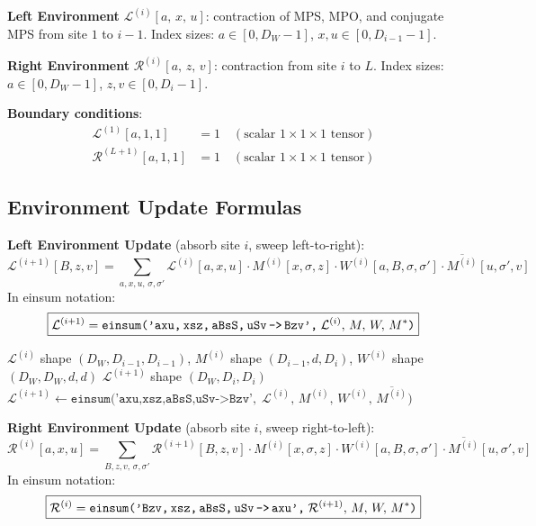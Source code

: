 \documentclass[aps,prb,onecolumn,scriptaddress]{revtex4-2}
\begin{document}
	\textbf{Left Environment}
	$\mathcal{L}^{(i)}[a,\, x,\, u]$: contraction of MPS, MPO, and conjugate MPS
	from site $1$ to $i-1$.
	Index sizes: $a \in [0, D_W-1]$, $x, u \in [0, D_{i-1}-1]$.
	
	\textbf{Right Environment}
	$\mathcal{R}^{(i)}[a,\, z,\, v]$: contraction from site $i$ to $L$.
	Index sizes: $a \in [0, D_W-1]$, $z, v \in [0, D_i-1]$.
	
	\textbf{Boundary conditions}:
	\begin{align}
		\mathcal{L}^{(1)}[a, 1, 1] &= 1\quad (\text{scalar }1\times1\times1\text{ tensor})\\
		\mathcal{R}^{(L+1)}[a, 1, 1] &= 1\quad (\text{scalar }1\times1\times1\text{ tensor})
	\end{align}
	
	\subsection{Environment Update Formulas}
	
	\textbf{Left Environment Update} (absorb site $i$, sweep left-to-right):
	\begin{equation}
		\mathcal{L}^{(i+1)}[B, z, v]
		= \sum_{a,x,u,\,\sigma,\sigma'}
		\mathcal{L}^{(i)}[a, x, u]\cdot
		M^{(i)}[x, \sigma, z]\cdot
		W^{(i)}[a, B, \sigma, \sigma']\cdot
		\overline{M^{(i)}}[u, \sigma', v]
	\end{equation}
	In einsum notation:
	\begin{equation}
		\boxed{
			\mathcal{L}^{(i+1)}
			= \texttt{einsum('axu,\,xsz,\,aBsS,\,uSv\,->\,Bzv',}\;
			\mathcal{L}^{(i)},\, M,\, W,\, M^*\texttt{)}
		}
	\end{equation}
	
	\begin{algorithm}[H]
		\caption{UpdateLeftEnvironment}
		\begin{algorithmic}[1]
			\Require $\mathcal{L}^{(i)}$ shape $(D_W, D_{i-1}, D_{i-1})$,\;
			$M^{(i)}$ shape $(D_{i-1}, d, D_i)$,\;
			$W^{(i)}$ shape $(D_W, D_W, d, d)$
			\Ensure $\mathcal{L}^{(i+1)}$ shape $(D_W, D_i, D_i)$
			\State $\mathcal{L}^{(i+1)} \gets
			\texttt{einsum('axu,xsz,aBsS,uSv->Bzv'},\;
			\mathcal{L}^{(i)},\, M^{(i)},\, W^{(i)},\, \overline{M^{(i)}}\texttt{)}$
		\end{algorithmic}
	\end{algorithm}
	
	\textbf{Right Environment Update} (absorb site $i$, sweep right-to-left):
	\begin{equation}
		\mathcal{R}^{(i)}[a, x, u]
		= \sum_{B,z,v,\,\sigma,\sigma'}
		\mathcal{R}^{(i+1)}[B, z, v]\cdot
		M^{(i)}[x, \sigma, z]\cdot
		W^{(i)}[a, B, \sigma, \sigma']\cdot
		\overline{M^{(i)}}[u, \sigma', v]
	\end{equation}
	In einsum notation:
	\begin{equation}
		\boxed{
			\mathcal{R}^{(i)}
			= \texttt{einsum('Bzv,\,xsz,\,aBsS,\,uSv\,->\,axu',}\;
			\mathcal{R}^{(i+1)},\, M,\, W,\, M^*\texttt{)}
		}
	\end{equation}
	
\end{document}
